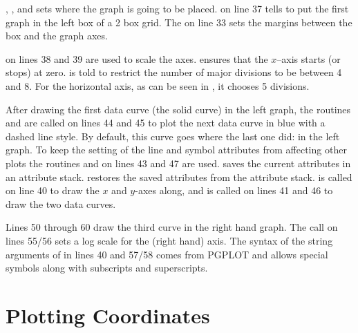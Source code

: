 ,
, and
 sets where the graph is
going to be placed.   on line 37 tells \quickplot to put the first graph in the left box
of a 2 box grid. The  on line
33 sets the margins between the box and the graph axes.

 on lines 38
and 39 are used to scale the axes.  ensures that the
$x$--axis starts (or stops) at zero.
 is told to
restrict the number of major divisions to be between 4 and 8. For the
horizontal axis, as can be seen in , it chooses
5 divisions.

After drawing the first data curve (the solid curve) in the left
graph, the routines
 and
 are called on
lines 44 and 45 to plot the next data curve in blue with a dashed line
style. By default, this curve goes where the last one did: in the left
graph. To keep the setting of the line and symbol attributes from
affecting other plots the routines
 and
 on lines 43 and 47 are
used.  saves the current
attributes in an attribute
stack.  restores the
saved attributes from the attribute
stack.  is called on line 40 to
draw the $x$ and $y$-axes along, and  is called on
lines 41 and 46 to draw the two data curves.

Lines 50 through 60 draw the third curve in the right hand graph.  The
 call on lines 55/56 sets a log scale for the 
(right hand) axis. The syntax of the string arguments of
 in lines 40 and 57/58 comes from PGPLOT and allows
special symbols along with subscripts and superscripts.

\section{Plotting Coordinates}
\label{s:plot.coords}

